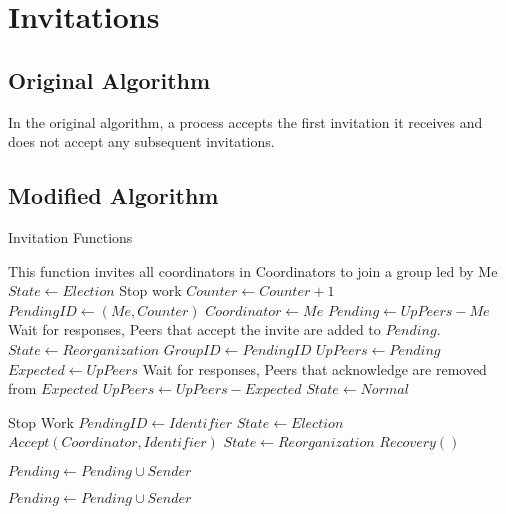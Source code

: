 \section{Invitations}

\subsection{Original Algorithm}

In the original algorithm, a process accepts the first invitation it receives and does not accept any subsequent invitations.

\subsection{Modified Algorithm}

\begin{algorithm}
\caption{Invitation Functions}
\begin{algorithmic}[1]
\small
{}
    \State This function invites all coordinators in Coordinators to join a group led by Me
    \State $State \gets Election$
    \State Stop work
    \State $Counter \gets Counter+1$
    \State $PendingID \gets (Me,Counter)$
    \State $Coordinator \gets Me$
    \State $Pending \gets UpPeers - {Me}$
    \EndFor
    \State Wait for responses, Peers that accept the invite are added to $Pending$.
    \State $State \gets Reorganization$
	\State $GroupID \gets PendingID$
	\State $UpPeers \gets Pending$
    \EndFor
    \State $Expected \gets UpPeers$
    \State Wait for responses, Peers that acknowledge are removed from $Expected$
    \State $UpPeers \gets UpPeers - Expected$
    \State $State \gets Normal$
\EndFunction

\State

        \Return
    \EndIf
        \Return
    \EndIf
    \State Stop Work
    \State $PendingID \gets Identifier$
    \State $State \gets Election$
    \State $Accept(Coordinator,Identifier)$
    \State $State \gets Reorganization$
        \State $Recovery()$
    \EndIf
\EndFunction

\State

        \State $Pending \gets Pending \cup {Sender}$
    \EndIf
\EndFunction

    \State $Pending \gets Pending \cup {Sender}$
\EndFunction

\end{algorithmic}
\end{algorithm}


